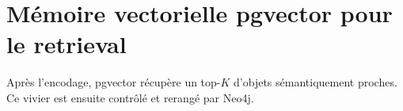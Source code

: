
\section{Mémoire vectorielle pgvector pour le retrieval}

Après l'encodage, pgvector récupère un top-$K$ d'objets sémantiquement proches. Ce vivier est ensuite contrôlé et rerangé par Neo4j.
